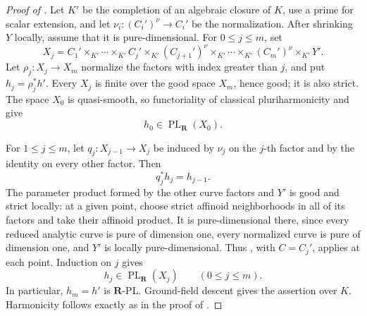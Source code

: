 \begin{proof}[Proof of ]
Let \(K'\) be the completion of an algebraic closure of \(K\), use a
prime for scalar extension, and let
\(\nu_i:(C_i')^\nu\to C_i'\) be the normalization.  After shrinking \(Y\)
locally, assume that it is pure-dimensional.  For \(0\leq j\leq m\), set
\[
 X_j=
 C_1'\times_{K'}\cdots\times_{K'}C_j'
 \times_{K'}(C_{j+1}')^\nu\times_{K'}\cdots
 \times_{K'}(C_m')^\nu\times_{K'}Y'.
\]
Let \(\rho_j:X_j\to X_m\) normalize the factors with index greater than
\(j\), and put \(h_j=\rho_j^*h'\).  Every \(X_j\) is finite over the good
space \(X_m\), hence good; it is also strict.  The space \(X_0\) is
quasi-smooth, so functoriality of classical pluriharmonicity and
 give
\[
                         h_0\in\operatorname{PL}_{\mathbf R}(X_0).
\]

For \(1\leq j\leq m\), let \(q_j:X_{j-1}\to X_j\) be induced by
\(\nu_j\) on the \(j\)-th factor and by the identity on every other
factor.  Then
\[
                             q_j^*h_j=h_{j-1}.
\]
The parameter product formed by the other curve factors and \(Y'\) is
good and strict locally: at a given point, choose strict affinoid
neighborhoods in all of its factors and take their affinoid product.  It
is pure-dimensional there, since every reduced analytic curve is pure of
dimension one, every normalized curve is pure of dimension one, and
\(Y'\) is locally pure-dimensional.  Thus
, with \(C=C_j'\),
applies at each point.  Induction on \(j\) gives
\[
                         h_j\in\operatorname{PL}_{\mathbf R}(X_j)
                         \qquad(0\leq j\leq m).
\]
In particular, \(h_m=h'\) is \(\mathbf R\)-PL.  Ground-field descent
\cite[Corollary~5.12]{GJR26} gives the assertion over \(K\).
Harmonicity follows exactly as in the proof of
.


\end{proof}
